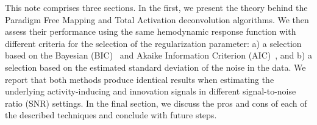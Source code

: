 This note comprises three sections. In the first, we present the theory behind the Paradigm Free Mapping and Total Activation deconvolution algorithms. We then assess their performance using the same hemodynamic response function with different criteria for the selection of the regularization parameter: a) a selection based on the Bayesian (BIC)~\cite{schwarz1978estimating} and Akaike Information Criterion (AIC)~\cite{akaike1998information}, and b) a selection based on the estimated standard deviation of the noise in the data. We report that both methods produce identical results when estimating the underlying activity-inducing and innovation signals in different signal-to-noise ratio (SNR) settings. In the final section, we discuss the pros and cons of each of the described techniques and conclude with future steps.